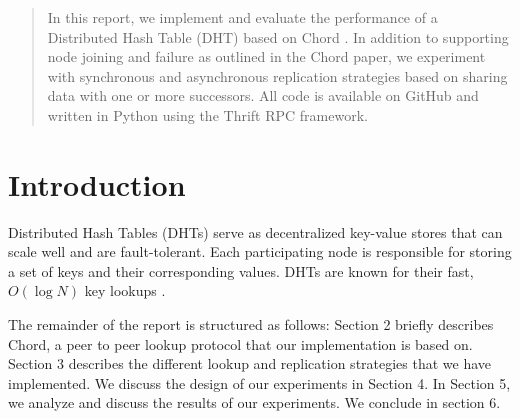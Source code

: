 \documentclass{sig-alternate-10pt}
\begin{document}
\maketitle
\begin{abstract}
In this report, we implement and evaluate the performance of a Distributed Hash Table (DHT) based on Chord \cite{chord}. In addition to supporting node joining and failure as outlined in the Chord paper, we experiment with synchronous and asynchronous replication strategies based on sharing data with one or more successors.  All code is available on GitHub \cite{github} and written in Python using the Thrift RPC \cite{thrift} framework.
\end{abstract}




\section{Introduction}
Distributed Hash Tables (DHTs) serve as decentralized key-value stores that can scale well and are fault-tolerant. Each participating node is responsible for storing a set of keys and their corresponding values. DHTs are known for their fast, $O(\log N)$ key lookups \cite{chord}.

The remainder of the report is structured as follows: Section 2 briefly describes Chord, a peer to peer lookup protocol that our implementation is based on. Section 3 describes the different lookup and replication strategies that we have implemented. We discuss the design of our experiments in Section 4. In Section 5, we analyze and discuss the results of our experiments. We conclude in section 6.
\end{document}

